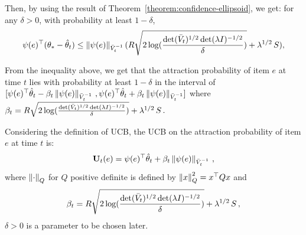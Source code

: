 Then, by using the result of Theorem~\ref{theorem:confidence-ellipsoid}, we get:
for any $\delta > 0$, with probability at least $1-\delta$,
\begin{align*}
\psi(e)^\top (\mathbf{\theta}_* - \hat{\mathbf{\theta}}_t) \le
 \left\| \psi(e)\right\|_{\bar{V}_{t}^{-1}} (R \sqrt{2 \log( \frac{\det (\bar{V}_{t})^{1/2}\det(\lambda I)^{-1/2}}{\delta} )} + \lambda^{1/2}\, S) ,
\end{align*}

From the inequality above, we get that the attraction probability of item $e$ at time $t$ lies with probability at least $1-\delta$ in the interval of
$[\psi(e)^\top \hat{\mathbf{\theta}}_t - \beta_t \left\|\psi(e) \right\|_{\bar{V}_t^{-1}}\, , \psi(e)^\top \hat{\mathbf{\theta}}_t + \beta_t \left\|\psi(e) \right\|_{\bar{V}_t^{-1}}]$ where $\beta_t = R \sqrt{2 \log( \frac{\det (\bar{V}_{t})^{1/2}\det(\lambda I)^{-1/2}}{\delta} )} + \lambda^{1/2}\, S\,.$

\begin{proposition}[UCB]
\label{proposition:UCB}
Considering the definition of UCB, the UCB on the attraction probability of item $e$ at time $t$ is:
\begin{align*}
  \mathbf{U}_t(e) = \psi(e)^\top \hat{\mathbf{\theta}}_t + \beta_t \left\|\psi(e) \right\|_{\bar{V}_t^{-1}}\,,
\end{align*}
where $\left\|\cdot\right\|_Q$ for $Q$ positive definite is defined by
$\left\|x\right\|^2_Q  = x^\top Q x$ and
\[
\beta_t = R \sqrt{2 \log( \frac{\det (\bar{V}_{t})^{1/2}\det(\lambda I)^{-1/2}}{\delta} )} + \lambda^{1/2}\, S\,,
\]
$\delta>0$ is a parameter to be chosen later.
\end{proposition}






